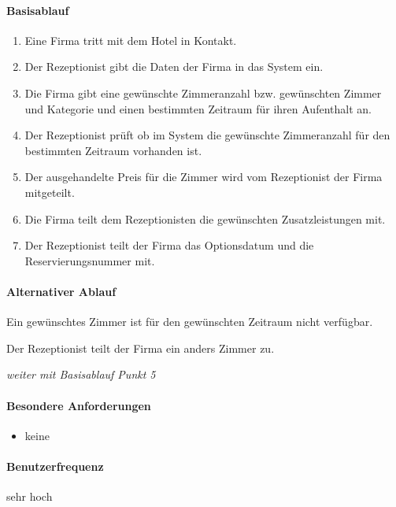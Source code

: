 \paragraph{Basisablauf}
\begin{enumerate}
	\item Eine Firma tritt mit dem Hotel in Kontakt.
	\item Der \Gls{Rezeptionist} gibt die Daten der Firma in das System ein.
	\item Die Firma gibt eine gewünschte Zimmeranzahl bzw. gewünschten \Gls{Zimmer} und Kategorie und einen bestimmten Zeitraum für ihren \Gls{Aufenthalt} an. 
    \item Der \Gls{Rezeptionist} prüft ob im System die gewünschte Zimmeranzahl für den bestimmten Zeitraum vorhanden ist. 
	\item Der ausgehandelte Preis für die \Gls{Zimmer} wird vom \Gls{Rezeptionist} der Firma mitgeteilt.
	\item Die Firma teilt dem \Gls{Rezeptionist}en die gewünschten Zusatzleistungen mit.
	\item Der \Gls{Rezeptionist} teilt der Firma das \Gls{Optionsdatum} und die
	\Gls{Reservierungsnummer} mit.
\end{enumerate}

\paragraph{Alternativer Ablauf}
\begin{longenum}
	\item
	\item
	\item
	\item
	\begin{longenum}
		\item Ein gewünschtes \Gls{Zimmer} ist für den gewünschten Zeitraum nicht verfügbar.
		\begin{longenum}
			\item Der \Gls{Rezeptionist} teilt der Firma ein anders \Gls{Zimmer} zu.
			\item \emph{weiter mit Basisablauf Punkt 5}
		\end{longenum}
	\end{longenum}
	\item
	\item
	\item
\end{longenum}

\paragraph{Besondere Anforderungen}
\begin{itemize}
	\item keine
\end{itemize}

\paragraph{Benutzerfrequenz}
sehr hoch

\newpage

